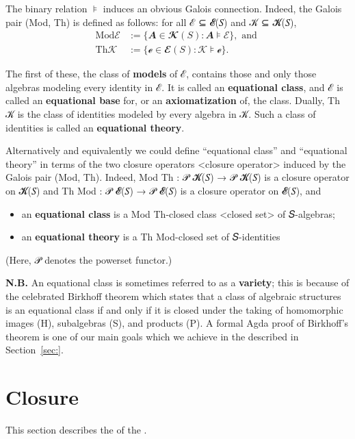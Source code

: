 \documentclass[a4paper,USenglish,cleveref,autoref,thm-restate]{lipics-v2019}
\begin{document}
The binary relation \(⊧\) induces an obvious Galois connection. Indeed, the Galois pair (Mod, Th) is defined as follows: for all ℰ ⊆ 𝓔(𝑆) and 𝒦 ⊆ 𝓚(𝑆),
\begin{align*}
\mathrm{Mod} ℰ &:= \{ 𝑨 ∈ 𝓚(𝑆) : 𝑨 ⊧ ℰ \}, \text{ and }\\
\mathrm{Th} 𝒦 &:= \{ℯ ∈ 𝓔(𝑆) : 𝒦 ⊧ ℯ \}.
\end{align*}

The first of these, the class of \textbf{models} of ℰ, contains those and only those algebras modeling every identity in ℰ. It is called an \textbf{equational class}, and ℰ is called an \textbf{equational base} for, or an \textbf{axiomatization} of, the class. Dually, Th 𝒦 is the class of identities modeled by every algebra in 𝒦. Such a class of identities is called an \textbf{equational theory}.

Alternatively and equivalently we could define ``equational class'' and ``equational theory'' in terms of the two
closure operators \textless{}closure operator\textgreater{} induced by the Galois pair (Mod, Th). Indeed, Mod Th : 𝒫 𝓚(𝑆) → 𝒫 𝓚(𝑆) is a closure operator on 𝓚(𝑆) and Th Mod : 𝒫 𝓔(𝑆) → 𝒫 𝓔(𝑆) is a closure operator on 𝓔(𝑆), and

\begin{itemize}
\item an \textbf{equational class} is a Mod Th-closed class \textless{}closed set\textgreater{} of 𝑆-algebras;
\item an \textbf{equational theory} is a Th Mod-closed set of 𝑆-identities
\end{itemize}
(Here, 𝒫 denotes the powerset functor.)

\noindent \textbf{N.B.} An equational class is sometimes referred to as a \textbf{variety}; this is because of the celebrated Birkhoff theorem which states that a class of algebraic structures is an equational class if and only if it is closed under the taking of homomorphic images (H), subalgebras (S), and products (P). A formal Agda proof of Birkhoff's theorem is one of our main goals which we achieve in the \birkhoffmodule described in Section~\ref{sec:}.






\section{Closure}\label{sec:closure}
This section describes the \closuremodule of the \agdaualib.
\end{document}
